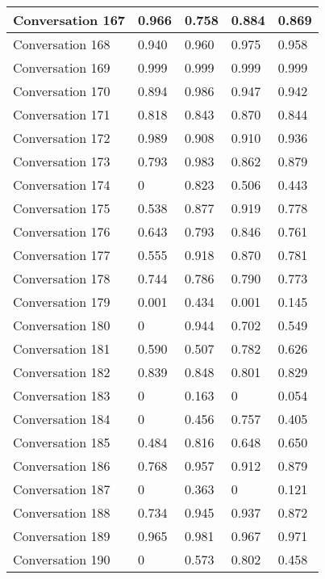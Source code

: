 \begin{table}[]
\begin{tabular}{|l|l|l|l|l|}
Conversation 167 & 0.966    & 0.758 & 0.884       & 0.869   \\ \hline
Conversation 168 & 0.940    & 0.960 & 0.975       & 0.958   \\ \hline
Conversation 169 & 0.999    & 0.999 & 0.999       & 0.999   \\ \hline
Conversation 170 & 0.894    & 0.986 & 0.947       & 0.942   \\ \hline
Conversation 171 & 0.818    & 0.843 & 0.870       & 0.844   \\ \hline
Conversation 172 & 0.989    & 0.908 & 0.910       & 0.936   \\ \hline
Conversation 173 & 0.793    & 0.983 & 0.862       & 0.879   \\ \hline
Conversation 174 & 0        & 0.823 & 0.506       & 0.443   \\ \hline
Conversation 175 & 0.538    & 0.877 & 0.919       & 0.778   \\ \hline
Conversation 176 & 0.643    & 0.793 & 0.846       & 0.761   \\ \hline
Conversation 177 & 0.555    & 0.918 & 0.870       & 0.781   \\ \hline
Conversation 178 & 0.744    & 0.786 & 0.790       & 0.773   \\ \hline
Conversation 179 & 0.001    & 0.434 & 0.001       & 0.145   \\ \hline
Conversation 180 & 0        & 0.944 & 0.702       & 0.549   \\ \hline
Conversation 181 & 0.590    & 0.507 & 0.782       & 0.626   \\ \hline
Conversation 182 & 0.839    & 0.848 & 0.801       & 0.829   \\ \hline
Conversation 183 & 0        & 0.163 & 0           & 0.054   \\ \hline
Conversation 184 & 0        & 0.456 & 0.757       & 0.405   \\ \hline
Conversation 185 & 0.484    & 0.816 & 0.648       & 0.650   \\ \hline
Conversation 186 & 0.768    & 0.957 & 0.912       & 0.879   \\ \hline
Conversation 187 & 0        & 0.363 & 0           & 0.121   \\ \hline
Conversation 188 & 0.734    & 0.945 & 0.937       & 0.872   \\ \hline
Conversation 189 & 0.965    & 0.981 & 0.967       & 0.971   \\ \hline
Conversation 190 & 0        & 0.573 & 0.802       & 0.458   \\ \hline

\end{tabular}
\end{table}
